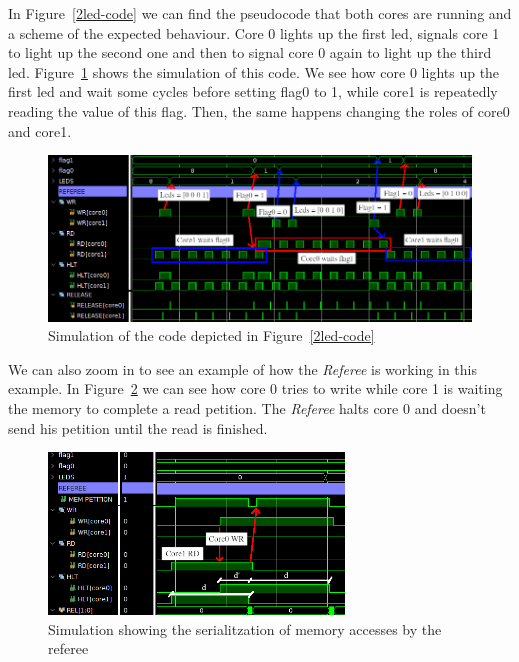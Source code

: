 In Figure~\ref{2led-code} we can find the pseudocode that both cores are running and a scheme of the expected behaviour.
Core 0 lights up the first led, signals core 1 to light up the second one and then to signal core 0 again to light up the third led.
Figure~\ref{2led-sim} shows the simulation of this code.
We see how core 0 lights up the first led and wait some cycles before setting flag0 to 1, while core1 is repeatedly reading the value of this flag.
Then, the same happens changing the roles of core0 and core1.

\begin{figure}[h!]
    \centering
    \includegraphics[width=1.0\textwidth]{images/flag2_sim_crop_arrows.png}
    \caption{Simulation of the code depicted in Figure~\ref{2led-code}}
    \label{2led-sim}
\end{figure}

We can also zoom in to see an example of how the \textit{Referee} is working in this example. In Figure~\ref{2led-close} we can see how core 0 tries to write while core 1 is waiting the memory to complete a read petition. 
The \textit{Referee} halts core 0 and doesn't send his petition until the read is finished.

\begin{figure}[h!]
    \centering
    \includegraphics[width=0.7\textwidth]{images/flag2_sim_close_arrow.png}
    \caption{Simulation showing the serialitzation of memory accesses by the referee}
    \label{2led-close}
\end{figure}

